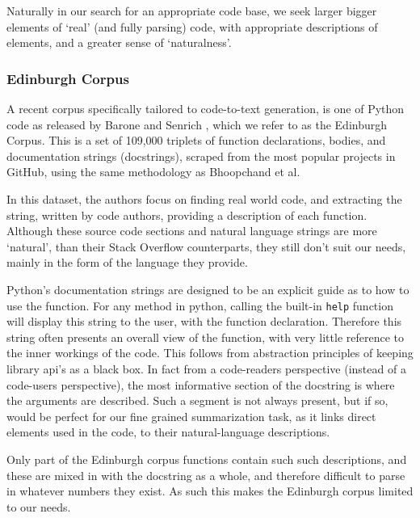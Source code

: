 Naturally in our search for an appropriate code base, we seek larger bigger elements of `real' (and fully parsing) code, with appropriate descriptions of elements, and a greater sense of `naturalness'.

\subsubsection{Edinburgh Corpus}

A recent corpus specifically tailored to code-to-text generation, is one of Python code as released by Barone and Senrich \cite{barone_parallel_2017}, which we refer to as the Edinburgh Corpus. 
This is a set of 109,000 triplets of function declarations, bodies, and documentation strings (docstrings), scraped from the most popular projects in GitHub, using the same methodology as Bhoopchand et al. 

In this dataset, the authors focus on finding real world code, and extracting the string, written by code authors, providing a description of each function.
Although these source code sections and natural language strings are more `natural', than their Stack Overflow counterparts, they still don't suit our needs, mainly in the form of the language they provide. 

Python's documentation strings are designed to be an explicit guide as to how to use the function. 
For any method in python, calling the built-in \texttt{help} function will display this string to the user, with the function declaration. 
Therefore this string often presents an overall view of the function, with very little reference to the inner workings of the code. 
This follows from abstraction principles of keeping library api's as a black box.
In fact from a code-readers perspective (instead of a code-users perspective), the most informative section of the docstring is where the arguments are described. 
Such a segment is not always present, but if so, would be perfect for our fine grained summarization task, as it links direct elements used in the code, to their natural-language descriptions. 

Only part of the Edinburgh corpus functions contain such such descriptions, and these are mixed in with the docstring as a whole, and therefore difficult to parse in whatever numbers they exist.
As such this makes the Edinburgh corpus limited to our needs.




